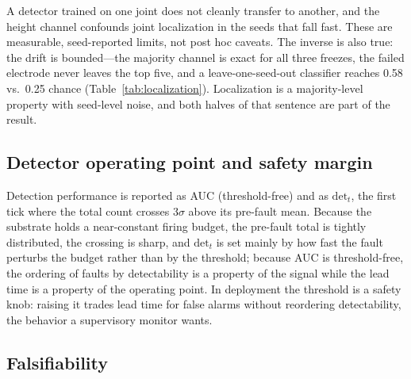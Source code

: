 A detector trained on one joint does not cleanly transfer to another, and the
height channel confounds joint localization in the seeds that fall fast. These
are measurable, seed-reported limits, not post hoc caveats. The inverse is also
true: the drift is bounded---the majority channel is exact for all three
freezes, the failed electrode never leaves the top five, and a leave-one-seed-out
classifier reaches 0.58 vs.\ 0.25 chance (Table~\ref{tab:localization}).
Localization is a majority-level property with seed-level noise, and both
halves of that sentence are part of the result.

\subsection{Detector operating point and safety margin}

Detection performance is reported as AUC (threshold-free) and as
$\mathrm{det}_t$, the first tick where the total count crosses $3\sigma$ above
its pre-fault mean. Because the substrate holds a near-constant firing budget,
the pre-fault total is tightly distributed, the crossing is sharp, and
$\mathrm{det}_t$ is set mainly by how fast the fault perturbs the budget rather
than by the threshold; because AUC is threshold-free, the ordering of faults by
detectability is a property of the signal while the lead time is a property of
the operating point. In deployment the threshold is a safety knob: raising it
trades lead time for false alarms without reordering detectability, the
behavior a supervisory monitor wants.

\subsection{Falsifiability}

